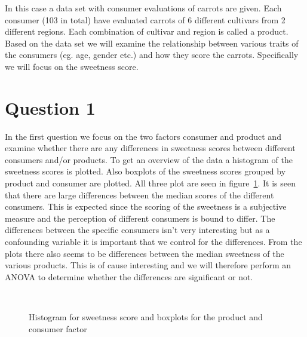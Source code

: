 \def\assignmenttitle{Consumer evaluations of carrots}
\def\assignmentdate{24-10-2011}
\def\coursetitle{02418 Statistical modelling}
\def\Consumer{\myverb{Consumer}}
\def\product{\myverb{product}}
\def\Sweetness{\myverb{Sweetness}}
\def\age{\myverb{age}}
\def\gender{\myverb{gender}}
\def\cultivar{\myverb{cultivar}}
\def\region{\myverb{region}}
\def\plotfolder{../plots}






\maketitle

In this case a data set with consumer evaluations of carrots are given. Each consumer (103 in total) have evaluated carrots of 6 different cultivars from 2 different regions. Each combination of cultivar and region is called a product. Based on the data set we will examine the relationship between various traits of the consumers (eg. age, gender etc.) and how they score the carrots. Specifically we will focus on the sweetness score.

\section*{Question 1}
In the first question we focus on the two factors consumer and product and examine whether there are any differences in sweetness scores between different consumers and/or products. To get an overview of the data a histogram of the sweetness scores is plotted. Also boxplots of the sweetness scores grouped by product and consumer are plotted. All three plot are seen in figure~\ref{fig:hist-and-boxplot}. It is seen that there are large differences between the median scores of the different consumers. This is expected since the scoring of the sweetness is a subjective measure and the perception of different consumers is bound to differ. The differences between the specific consumers isn't very interesting but as a confounding variable it is important that we control for the differences. From the plots there also seems to be differences between the median sweetness of the various products. This is of cause interesting and we will therefore perform an ANOVA to determine whether the differences are significant or not.

\begin{figure}
    \centering
    \mbox{   \quad 
            }
    \mbox{  }
    \caption{Histogram for sweetness score and boxplots for the product and consumer factor}
    \label{fig:hist-and-boxplot}
\end{figure}

